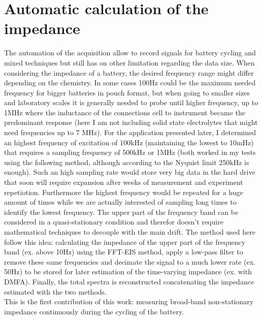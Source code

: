 \section{Automatic calculation of the impedance}
The automation of the acquisition allow to record signals for battery cycling and mixed techniques but still has on other limitation regarding the data size. When considering the impedance of a battery, the desired frequency range might differ depending on the chemistry. In some cases 100Hz could be the maximum needed frequency for bigger batteries in pouch format, but when going to smaller sizes and laboratory scales it is generally needed to probe until higher frequency, up to 1MHz where the inductance of the connections cell to instrument became the predominant response (here I am not including solid state electrolytes that might need frequencies up to 7 MHz). For the application presented later, I determined an highest frequency of excitation of 100kHz (maintaining the lowest to 10mHz) that requires a sampling frequency of 500kHz or 1MHz (both worked in my tests using the following method, although according to the Nyquist limit 250kHz is enough). Such an high sampling rate would store very big data in the hard drive that soon will require expansion after weeks of measurement and experiment repetiotion. Furthermore the highest frequency would be repeated for a huge amount of times while we are actually interested of sampling long times to identify the lowest frequency. The upper part of the frequency band can be considered in a quasi-stationary condition and therefor doesn't require mathematical techniques to decouple with the main drift. The method used here follow this idea: calculating the impedance of the upper part of the frequency band (ex. above 10Hz) using the FFT-EIS method, apply a low-pass filter to remove these same frequencies and decimate the signal to a much lower rate (ex. 50Hz) to be stored for later estimation of the time-varying impedance (ex. with DMFA). Finally, the total spectra is reconstructed concatenating the impedance estimated with the two methods.\\
This is the first contribution of this work: measuring broad-band non-stationary impedance continuously during the cycling of the battery.

